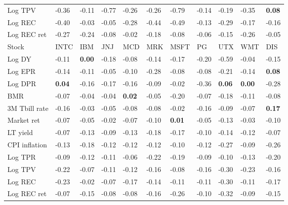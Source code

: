 \begin{table}[h!]
{\begin{center}
\begin{tabularx}{1\textwidth}{@{}X@{\hspace{0.25cm}}l@{\hspace{0.25cm}}l@{\hspace{0.25cm}}l@{\hspace{0.25cm}}l@{\hspace{0.25cm}}l@{\hspace{0.25cm}}l@{\hspace{0.25cm}}l@{\hspace{0.25cm}}l@{\hspace{0.25cm}}l@{\hspace{0.25cm}}l@{}}
 Log TPV  & -0.36	 & -0.11	 & -0.77	 & -0.26	 & -0.26	 & -0.79	 & -0.14	 & -0.19	 & -0.35	 & \textbf{0.08}	\\
 Log REC  & -0.40	 & -0.03	 & -0.05	 & -0.28	 & -0.44	 & -0.49	 & -0.13	 & -0.29	 & -0.17	 & -0.16	\\
 Log REC ret  & -0.27	 & -0.24	 & -0.08	 & -0.02	 & -0.18	 & -0.08	 & -0.06	 & -0.15	 & -0.26	 & -0.05	\\
\midrule
\midrule
 Stock  & INTC	 & IBM	 & JNJ	 & MCD	 & MRK	 & MSFT	 & PG	 & UTX	 & WMT	 & DIS	\\
\midrule
 Log DY  & -0.11	 & \textbf{0.00}	 & -0.18	 & -0.08	 & -0.14	 & -0.17	 & -0.20	 & -0.59	 & -0.04	 & -0.15	\\
 Log EPR  & -0.14	 & -0.11	 & -0.05	 & -0.10	 & -0.28	 & -0.08	 & -0.08	 & -0.21	 & -0.14	 & \textbf{0.08}	\\
 Log DPR  & \textbf{0.04}	 & -0.16	 & -0.17	 & -0.16	 & -0.09	 & -0.02	 & -0.36	 & \textbf{0.06}	 & \textbf{0.00}	 & -0.28	\\
 BMR  & -0.07	 & -0.04	 & -0.04	 & \textbf{0.02}	 & -0.05	 & -0.20	 & -0.07	 & -0.18	 & -0.11	 & -0.08	\\
\midrule
 3M Tbill rate  & -0.16	 & -0.03	 & -0.05	 & -0.08	 & -0.08	 & -0.02	 & -0.16	 & -0.09	 & -0.07	 & \textbf{0.17}	\\
 Market ret  & -0.07	 & -0.05	 & -0.02	 & -0.07	 & -0.10	 & \textbf{0.01}	 & -0.05	 & -0.13	 & -0.03	 & -0.10	\\
 LT yield  & -0.07	 & -0.13	 & -0.09	 & -0.13	 & -0.18	 & -0.17	 & -0.10	 & -0.14	 & -0.12	 & -0.07	\\
 CPI inflation  & -0.13	 & -0.18	 & -0.12	 & -0.12	 & -0.12	 & -0.10	 & -0.12	 & -0.27	 & -0.09	 & -0.26	\\
\midrule
 Log TPR  & -0.09	 & -0.12	 & -0.11	 & -0.06	 & -0.22	 & -0.19	 & -0.09	 & -0.10	 & -0.13	 & -0.20	\\
 Log TPV  & -0.22	 & -0.07	 & -0.11	 & -0.12	 & -0.16	 & -0.08	 & -0.16	 & -0.30	 & -0.23	 & -0.16	\\
 Log REC  & -0.23	 & -0.02	 & -0.07	 & -0.17	 & -0.14	 & -0.11	 & -0.11	 & -0.30	 & -0.11	 & -0.17	\\
 Log REC ret  & -0.07	 & -0.15	 & -0.08	 & -0.08	 & -0.16	 & -0.26	 & -0.10	 & -0.32	 & -0.09	 & -0.15	\\
\bottomrule\bottomrule
\end{tabularx}
\vspace{0.2cm}

\end{center}}
\end{table}
